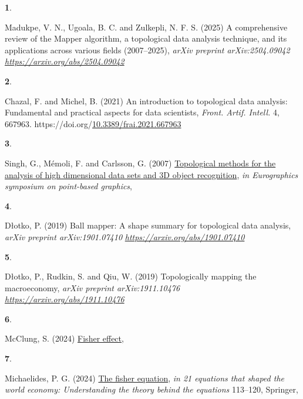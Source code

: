 \documentclass[
  10pt,
  letterpaper,
  DIV=11,
  numbers=noendperiod]{scrartcl}
\newlength{\cslhangindent}
\newlength{\csllabelwidth}
\newenvironment{CSLReferences}[2] %
 {\begin{list}{}{%
  \setlength{\itemindent}{0pt}
  \setlength{\leftmargin}{0pt}
  \setlength{\parsep}{0pt}
  \ifodd #1
   \setlength{\leftmargin}{\cslhangindent}
   \setlength{\itemindent}{-1\cslhangindent}
  \fi
  \setlength{\itemsep}{#2\baselineskip}}}
 {\end{list}}
\newcommand{\CSLLeftMargin}[1]{\parbox[t]{\csllabelwidth}{\strut#1\strut}}
\newcommand{\CSLRightInline}[1]{\parbox[t]{\linewidth - \csllabelwidth}{\strut#1\strut}}
\begin{document}
\label{refs}
\begin{CSLReferences}{1}{0}
\CSLLeftMargin{\textbf{1}. }%
\CSLRightInline{Madukpe, V. N., Ugoala, B. C. and Zulkepli, N. F. S.
(2025) A comprehensive review of the {M}apper algorithm, a topological
data analysis technique, and its applications across various fields
(2007--2025), \emph{arXiv preprint arXiv:2504.09042}
\emph{\url{https://arxiv.org/abs/2504.09042}}}

\CSLLeftMargin{\textbf{2}. }%
\CSLRightInline{Chazal, F. and Michel, B. (2021) An introduction to
topological data analysis: Fundamental and practical aspects for data
scientists, \emph{Front. Artif. Intell.} 4, 667963.
https://doi.org/\href{https://doi.org/10.3389/frai.2021.667963}{10.3389/frai.2021.667963}}

\CSLLeftMargin{\textbf{3}. }%
\CSLRightInline{Singh, G., Mémoli, F. and Carlsson, G. (2007)
\href{https://www.researchgate.net/profile/Facundo-Memoli/publication/221571174_Topological_Methods_for_the_Analysis_of_High_Dimensional_Data_Sets_and_3D_Object_Recognition/links/02bfe50fe76b396b8f000000/Topological-Methods-for-the-Analysis-of-High-Dimensional-Data-Sets-and-3D-Object-Recognition.pdf}{Topological
methods for the analysis of high dimensional data sets and {3D} object
recognition}, \emph{in Eurographics symposium on point-based graphics},
}

\CSLLeftMargin{\textbf{4}. }%
\CSLRightInline{Dłotko, P. (2019) Ball mapper: A shape summary for
topological data analysis, \emph{arXiv preprint arXiv:1901.07410}
\emph{\url{https://arxiv.org/abs/1901.07410}}}

\CSLLeftMargin{\textbf{5}. }%
\CSLRightInline{Dłotko, P., Rudkin, S. and Qiu, W. (2019) Topologically
mapping the macroeconomy, \emph{arXiv preprint arXiv:1911.10476}
\emph{\url{https://arxiv.org/abs/1911.10476}}}

\CSLLeftMargin{\textbf{6}. }%
\CSLRightInline{McClung, S. (2024)
\href{https://inomics.com/terms/fisher-effect-1545486}{Fisher effect}, }

\CSLLeftMargin{\textbf{7}. }%
\CSLRightInline{Michaelides, P. G. (2024)
\href{https://doi.org/10.1007/978-3-031-76140-9_9}{The fisher equation},
\emph{in 21 equations that shaped the world economy: Understanding the
theory behind the equations} 113--120, Springer, }


\end{CSLReferences}
\end{document}
